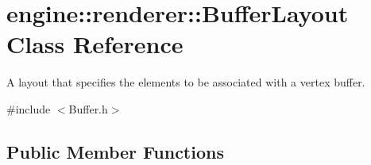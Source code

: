 \hypertarget{classengine_1_1renderer_1_1BufferLayout}{}\section{engine\+:\+:renderer\+:\+:Buffer\+Layout Class Reference}
\label{classengine_1_1renderer_1_1BufferLayout}


A layout that specifies the elements to be associated with a vertex buffer.  




{\ttfamily \#include $<$Buffer.\+h$>$}

\subsection*{Public Member Functions}
